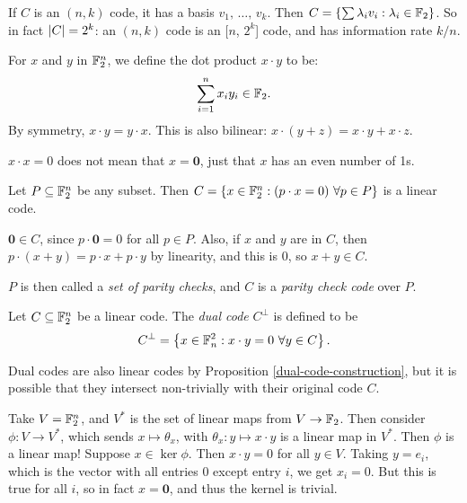 \documentclass{article}
\begin{document}
\begin{corollary}
    If $C$ is an $(n, k)$ code, it has a basis $v_1, \, \dots, \, v_k$.
    Then $C = \left\lbrace \sum \lambda_i v_i : \lambda_i \in \mathbb{F}_2 \right\rbrace$.
    So in fact $\left\lvert C \right\rvert = 2^k$: an $(n, k)$ code is an [$n$, $2^k$] code,
    and has information rate $k/n$.
\end{corollary}

\begin{definition}
    For $x$ and $y$ in $\mathbb{F}_2^n$, we define the dot product $x \cdot y$ to be:
    \[
	\sum_{i=1}^n x_i y_i \in \mathbb{F}_2.
	\]
	By symmetry, $x \cdot y = y \cdot x$.
	This is also bilinear: $x \cdot (y + z) = x \cdot y + x \cdot z$.
\end{definition}

\begin{note}
	$x \cdot x = 0$ does not mean that $x = \textbf{0}$,
	just that $x$ has an even number of 1s.
\end{note}

\begin{proposition}
	\label{dual-code-construction}
    Let $P \subseteq \mathbb{F}_2^n$ be any subset. Then
	$C = \left\lbrace x \in \mathbb{F}_2^n : (p \cdot x = 0) \ \forall p \in P \right\rbrace$
	is a linear code.
\end{proposition}
\begin{prf}
    $\textbf{0} \in C$, since $p \cdot \mathbf{0} = 0$ for all $p \in P$.
    Also, if $x$ and $y$ are in $C$, then
    $p \cdot (x + y) = p \cdot x + p \cdot y$
    by linearity, and this is 0, so $x + y \in C$.
\end{prf}

\begin{note}
	$P$ is then called a \textit{set of parity checks},
	and $C$ is a \textit{parity check code} over $P$.
\end{note}

\begin{definition}
    Let $C \subseteq \mathbb{F}_2^n$ be a linear code.
    The \textit{dual code} $C^\bot$ is defined to be
    \[
	C^\bot = \left\lbrace x \in \mathbb{F}^2_n : x \cdot y = 0 \ \forall y \in C \right\rbrace.
	\]
\end{definition}

\begin{note}
	Dual codes are also linear codes by Proposition \ref{dual-code-construction},
	but it is possible that they intersect non-trivially with their original code $C$.
\end{note}

Take $V = \mathbb{F}_2^n$, and $V^*$ is the set of linear maps from $V \to \mathbb{F}_2$.
Then consider $\phi : V \to V^*$, which sends $x \mapsto \theta_x$,
with $\theta_x : y \mapsto x \cdot y$ is a linear map in $V^*$.
Then $\phi$ is a linear map!
Suppose $x \in \ker \phi$. Then $x \cdot y = 0$ for all $y \in V$.
Taking $y = e_i$, which is the vector with all entries 0 except entry $i$,
we get $x_i = 0$. But this is true for all $i$, so in fact $x = \textbf{0}$,
and thus the kernel is trivial.
\end{document}
